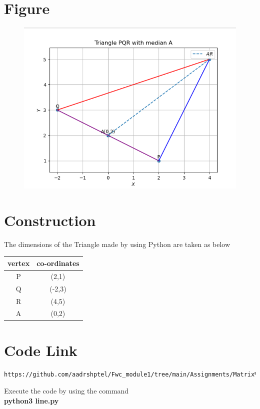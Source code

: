 \documentclass[journal,12pt,twocolumn]{IEEEtran}
\begin{document}
\newpage


\section{\textbf{Figure}}
\begin{figure}[h]
    \centering
\includegraphics[width=\columnwidth]{line.png}
    \label{fig:my_label}
\end{figure}


\section*{Construction}
The dimensions of the Triangle made by using Python  are taken as below\\
\linebreak
{
\centering
	\begin{tabular}{|c|c|}
	\hline
	\textbf{vertex}&\textbf{co-ordinates}\\
	\hline
	P&(2,1)\\
	\hline
	Q&(-2,3)\\
	\hline
	R&(4,5)\\
	\hline
	A&(0,2)\\
	\hline
\end{tabular}
}
\section{\textbf{Code Link}}

\begin{lstlisting}
https://github.com/aadrshptel/Fwc_module1/tree/main/Assignments/Matrix%20assignments/Lines/codes
\end{lstlisting}
Execute the code by using the command\\
\textbf{python3 line.py}
\end{document}
